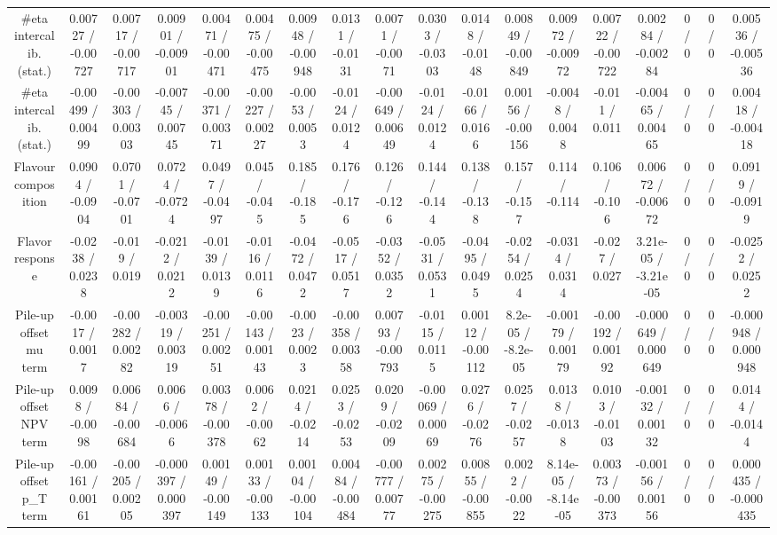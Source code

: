 \documentclass[10pt]{article}
\begin{document}
\begin{table}[htbp]
\begin{center}
\begin{tabular}{|c|c|c|c|c|c|c|c|c|c|c|c|c|c|c|c|c|c|}
  #eta intercalib. (stat.) & 0.00727 / -0.00727 & 0.00717 / -0.00717 & 0.00901 / -0.00901 & 0.00471 / -0.00471 & 0.00475 / -0.00475 & 0.00948 / -0.00948 & 0.0131 / -0.0131 & 0.0071 / -0.0071 & 0.0303 / -0.0303 & 0.0148 / -0.0148 & 0.00849 / -0.00849 & 0.00972 / -0.00972 & 0.00722 / -0.00722 & 0.00284 / -0.00284 & 0 / 0 & 0 / 0 & 0.00536 / -0.00536 \\ 
  #eta intercalib. (stat.) & -0.00499 / 0.00499 & -0.00303 / 0.00303 & -0.00745 / 0.00745 & -0.00371 / 0.00371 & -0.00227 / 0.00227 & -0.0053 / 0.0053 & -0.0124 / 0.0124 & -0.00649 / 0.00649 & -0.0124 / 0.0124 & -0.0166 / 0.0166 & 0.00156 / -0.00156 & -0.0048 / 0.0048 & -0.011 / 0.011 & -0.00465 / 0.00465 & 0 / 0 & 0 / 0 & 0.00418 / -0.00418 \\ 
  Flavour composition & 0.0904 / -0.0904 & 0.0701 / -0.0701 & 0.0724 / -0.0724 & 0.0497 / -0.0497 & 0.045 / -0.045 & 0.185 / -0.185 & 0.176 / -0.176 & 0.126 / -0.126 & 0.144 / -0.144 & 0.138 / -0.138 & 0.157 / -0.157 & 0.114 / -0.114 & 0.106 / -0.106 & 0.00672 / -0.00672 & 0 / 0 & 0 / 0 & 0.0919 / -0.0919 \\ 
  Flavor response & -0.0238 / 0.0238 & -0.019 / 0.019 & -0.0212 / 0.0212 & -0.0139 / 0.0139 & -0.0116 / 0.0116 & -0.0472 / 0.0472 & -0.0517 / 0.0517 & -0.0352 / 0.0352 & -0.0531 / 0.0531 & -0.0495 / 0.0495 & -0.0254 / 0.0254 & -0.0314 / 0.0314 & -0.027 / 0.027 & 3.21e-05 / -3.21e-05 & 0 / 0 & 0 / 0 & -0.0252 / 0.0252 \\ 
  Pile-up offset mu term & -0.0017 / 0.0017 & -0.00282 / 0.00282 & -0.00319 / 0.00319 & -0.00251 / 0.00251 & -0.00143 / 0.00143 & -0.0023 / 0.0023 & -0.00358 / 0.00358 & 0.00793 / -0.00793 & -0.0115 / 0.0115 & 0.00112 / -0.00112 & 8.2e-05 / -8.2e-05 & -0.00179 / 0.00179 & -0.00192 / 0.00192 & -0.000649 / 0.000649 & 0 / 0 & 0 / 0 & -0.000948 / 0.000948 \\ 
  Pile-up offset NPV term & 0.0098 / -0.0098 & 0.00684 / -0.00684 & 0.0066 / -0.0066 & 0.00378 / -0.00378 & 0.0062 / -0.0062 & 0.0214 / -0.0214 & 0.0253 / -0.0253 & 0.0209 / -0.0209 & -0.00069 / 0.00069 & 0.0276 / -0.0276 & 0.0257 / -0.0257 & 0.0138 / -0.0138 & 0.0103 / -0.0103 & -0.00132 / 0.00132 & 0 / 0 & 0 / 0 & 0.0144 / -0.0144 \\ 
  Pile-up offset p_{T} term & -0.00161 / 0.00161 & -0.00205 / 0.00205 & -0.000397 / 0.000397 & 0.00149 / -0.00149 & 0.00133 / -0.00133 & 0.00104 / -0.00104 & 0.00484 / -0.00484 & -0.00777 / 0.00777 & 0.00275 / -0.00275 & 0.00855 / -0.00855 & 0.0022 / -0.0022 & 8.14e-05 / -8.14e-05 & 0.00373 / -0.00373 & -0.00156 / 0.00156 & 0 / 0 & 0 / 0 & 0.000435 / -0.000435 \\ 

\end{tabular}
\end{center}
\end{table}
\end{document}
